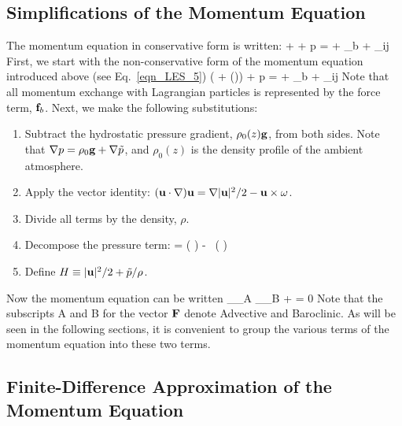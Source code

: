 \subsection{Simplifications of the Momentum Equation}

The momentum equation in conservative form is written:
\be
    + \nabla \cdot \rho \bu \bu + \nabla p = \rho \bg + \bof_b + \nabla\!\cdot \btau_{ij}  \label{con_momentum}
\ee
First, we start with the non-conservative form of the momentum equation introduced above (see Eq.~\ref{eqn_LES_5})
\be
   \rho \left(  + (\bu \cdot \nabla)\bu  \right) + \nabla p = \rho \bg + \bof_b + \nabla\!\cdot \btau_{ij}  \label{momentum}
\ee
Note that all momentum exchange with Lagrangian particles is represented by the force term, ${\mathbf{f}}_b$. Next, we make the following substitutions:
\begin{enumerate}
\item Subtract the hydrostatic pressure gradient, $\rho_0(z) {\mathbf{g}}$, from both sides. Note that $\nabla p=\rho_0 {\mathbf{g}} + \nabla \tilde{p}$, and $\rho_0(z)$ is the density profile of the ambient atmosphere.
\item Apply the vector identity: $({\mathbf{u}} \cdot \nabla) {\mathbf{u}} = \nabla|{\mathbf{u}}|^2/2 - {\mathbf{u}}\times{\mathbf{\omega}}$.
\item Divide all terms by the density, $\rho$.
\item Decompose the pressure term:
   \be {} \nabla \tp = \nabla \left( \frac{\tp}{\rho}\right) - \tp \, \nabla \left( \right)  \label{p_decomp} \ee
\item Define $H \equiv |{\mathbf{u}}|^2/2 + \tilde{p}/\rho$.
\end{enumerate}
Now the momentum equation can be written
\be
    _{\bF_{\rm A}}  _{\bF_{\rm B}} + \nabla \cH =  0 \label{momeq}
\ee
Note that the subscripts A and B for the vector ${\mathbf{F}}$ denote Advective and Baroclinic. As will be seen in the following sections, it is convenient to group the various terms of the momentum equation into these two terms.

\subsection{Finite-Difference Approximation of the Momentum Equation}
\label{findiffmom}

